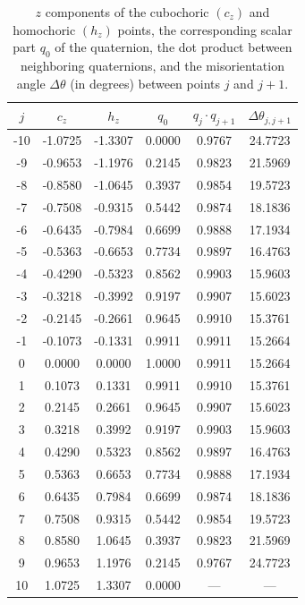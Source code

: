 \begin{table}[h!]
\centering\leavevmode
{\small\begin{tabular}{cccccc}
\hline
$j$ & $c_z$ & $h_z$ & $q_0$ & $q_j\cdot q_{j+1}$ & $\Delta\theta_{j,j+1}$ \\
\hline\hline
-10 & -1.0725 & -1.3307 &  0.0000 &  0.9767 & 24.7723 \\
 -9 & -0.9653 & -1.1976 &  0.2145 &  0.9823 & 21.5969 \\
 -8 & -0.8580 & -1.0645 &  0.3937 &  0.9854 & 19.5723 \\
 -7 & -0.7508 & -0.9315 &  0.5442 &  0.9874 & 18.1836 \\
 -6 & -0.6435 & -0.7984 &  0.6699 &  0.9888 & 17.1934 \\
 -5 & -0.5363 & -0.6653 &  0.7734 &  0.9897 & 16.4763 \\
 -4 & -0.4290 & -0.5323 &  0.8562 &  0.9903 & 15.9603 \\
 -3 & -0.3218 & -0.3992 &  0.9197 &  0.9907 & 15.6023 \\
 -2 & -0.2145 & -0.2661 &  0.9645 &  0.9910 & 15.3761 \\
 -1 & -0.1073 & -0.1331 &  0.9911 &  0.9911 & 15.2664 \\
  0 &  0.0000 &  0.0000 &  1.0000 &  0.9911 & 15.2664 \\
  1 &  0.1073 &  0.1331 &  0.9911 &  0.9910 & 15.3761 \\
  2 &  0.2145 &  0.2661 &  0.9645 &  0.9907 & 15.6023 \\
  3 &  0.3218 &  0.3992 &  0.9197 &  0.9903 & 15.9603 \\
  4 &  0.4290 &  0.5323 &  0.8562 &  0.9897 & 16.4763 \\
  5 &  0.5363 &  0.6653 &  0.7734 &  0.9888 & 17.1934 \\
  6 &  0.6435 &  0.7984 &  0.6699 &  0.9874 & 18.1836 \\
  7 &  0.7508 &  0.9315 &  0.5442 &  0.9854 & 19.5723 \\
  8 &  0.8580 &  1.0645 &  0.3937 &  0.9823 & 21.5969 \\
  9 &  0.9653 &  1.1976 &  0.2145 &  0.9767 & 24.7723 \\
 10 & 1.0725 &  1.3307 &  0.0000 & --- & ---  \\
 \hline
\end{tabular}}
\caption{\label{\chabbr:tb:cubogrid}$z$ components of the cubochoric $(c_z)$ and homochoric $(h_z)$ points, the corresponding scalar part $q_0$ of the quaternion, the dot product between neighboring quaternions,  and the misorientation angle $\Delta\theta$ (in degrees) between points $j$ and $j+1$.}
\end{table}

